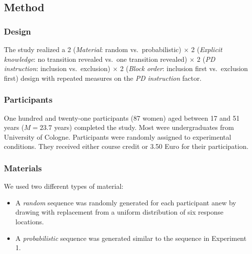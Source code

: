 \documentclass[man]{apa6}
\providecommand{\tightlist}{%
  \setlength{\itemsep}{0pt}\setlength{\parskip}{0pt}}
\theoremstyle{definition}
\theoremstyle{definition}
\theoremstyle{definition}
\theoremstyle{remark}
\begin{document}
\subsection{Method}\label{method-1}

\subsubsection{Design}\label{design-1}

The study realized a 2 (\emph{Material}: random vs.~probabilistic)
\(\times\) 2 (\emph{Explicit knowledge}: no transition revealed vs.~one
transition revealed) \(\times\) 2 (\emph{PD instruction}: inclusion
vs.~exclusion) \(\times\) 2 (\emph{Block order}: inclusion first
vs.~exclusion first) design with repeated measures on the \emph{PD
instruction} factor.

\subsubsection{Participants}\label{participants-1}

One hundred and twenty-one participants (87 women) aged between 17 and
51 years (\(M = 23.7\) years) completed the study. Most were
undergraduates from University of Cologne. Participants were randomly
assigned to experimental conditions. They received either course credit
or 3.50 Euro for their participation.

\subsubsection{Materials}\label{materials-1}

We used two different types of material:

\begin{itemize}
\tightlist
\item
  A \emph{random} sequence was randomly generated for each participant
  anew by drawing with replacement from a uniform distribution of six
  response locations. 
\item
  A \emph{probabilistic} sequence was generated similar to the sequence
  in Experiment 1.
\end{itemize}
\end{document}
